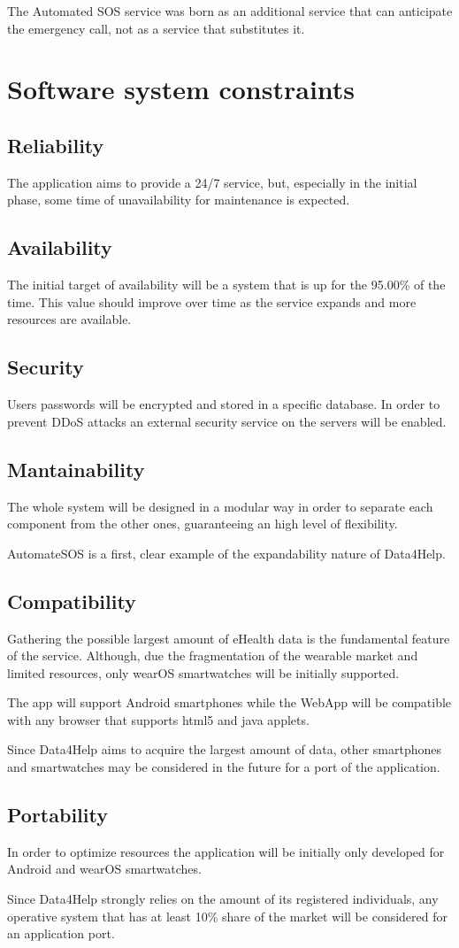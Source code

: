 The Automated SOS service was born as an additional service that can anticipate the emergency call, not as a service that substitutes it.


\section{Software system constraints}
\subsection{Reliability}
The application aims to provide a 24/7 service, but, especially in the initial phase, some time of unavailability for maintenance is expected.
\subsection{Availability}
The initial target of availability will be a system that is up for the 95.00\% of the time. This value should improve over time as the service expands and more resources are available.
\subsection{Security}
Users passwords will be encrypted and stored in a specific database.
In order to prevent DDoS attacks an external security service on the servers will be enabled.
\subsection{Mantainability}
The whole system will be designed in a modular way in order to separate each component from the other ones, guaranteeing an high level of flexibility. 

AutomateSOS is a first, clear example of the expandability nature of Data4Help.
\subsection{Compatibility}
Gathering the possible largest amount of eHealth data is the fundamental feature of the service. Although, due the fragmentation of the wearable market and limited resources, only wearOS smartwatches will be initially supported. 


The app will support Android smartphones while the WebApp will be compatible with any browser that supports html5 and java applets.


Since Data4Help aims to acquire the largest amount of data, other smartphones and smartwatches may be considered in the future for a port of the application.


\subsection{Portability}
In order to optimize resources the application will be initially only developed for Android and wearOS smartwatches.

Since Data4Help strongly relies on the amount of its registered individuals, any operative system that has at least 10\% share of the market will be considered for an application port.
